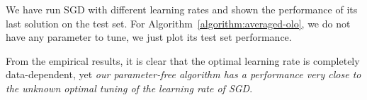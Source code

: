 We have run \ac{SGD} with different learning rates and shown the performance of its last solution on the test set. For Algorithm~\ref{algorithm:averaged-olo}, we do not have any parameter to tune, we just plot its test set performance.

From the empirical results, it is clear that the optimal learning rate is completely
data-dependent, yet \emph{our parameter-free algorithm has a performance very close
to the unknown optimal tuning of the learning rate of \ac{SGD}}.
